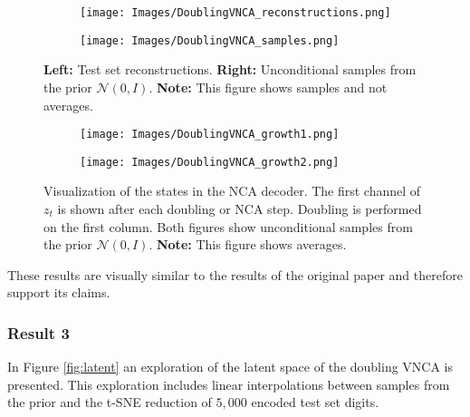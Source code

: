 \begin{figure}[ht]
    \begin{subfigure}{.5\textwidth}
        \centering
        \texttt{[image: Images/DoublingVNCA\_reconstructions.png]}
        \label{fig:DoublingVNCA_reconstructions}
    \end{subfigure}
    \begin{subfigure}{.5\textwidth}
        \centering
        \texttt{[image: Images/DoublingVNCA\_samples.png]}
        \label{fig:DoublingVNCA_samples}
    \end{subfigure}
    \caption{\textbf{Left:} Test set reconstructions. \textbf{Right:} Unconditional samples from the prior $\mathcal{N}(0, I)$. \textbf{Note:} This figure shows samples and not averages.}
    \label{fig:DoublingVNCA_recon_samples}
\end{figure}


\begin{figure}[ht]
    \begin{subfigure}{.5\textwidth}
        \centering
        \texttt{[image: Images/DoublingVNCA\_growth1.png]}
        \label{fig:DoublingVNCA_growth1}
    \end{subfigure}
    \begin{subfigure}{.5\textwidth}
        \centering
        \texttt{[image: Images/DoublingVNCA\_growth2.png]}
        \label{fig:DoublingVNCA_growth2}
    \end{subfigure}
    \caption{Visualization of the states in the NCA decoder. The first channel of $z_t$ is shown after each doubling or NCA step. Doubling is performed on the first column. Both figures show unconditional samples from the prior $\mathcal{N}(0, I)$. \textbf{Note:} This figure shows averages.}
    \label{fig:DoublingVNCA_growth}
\end{figure}
These results are visually similar to the results of the original paper and therefore support its claims.

\subsubsection{Result 3}

In Figure \ref{fig:latent} an exploration of the latent space of the doubling VNCA is presented. This exploration includes linear interpolations between samples from the prior and the t-SNE reduction of $5,000$ encoded test set digits. 

